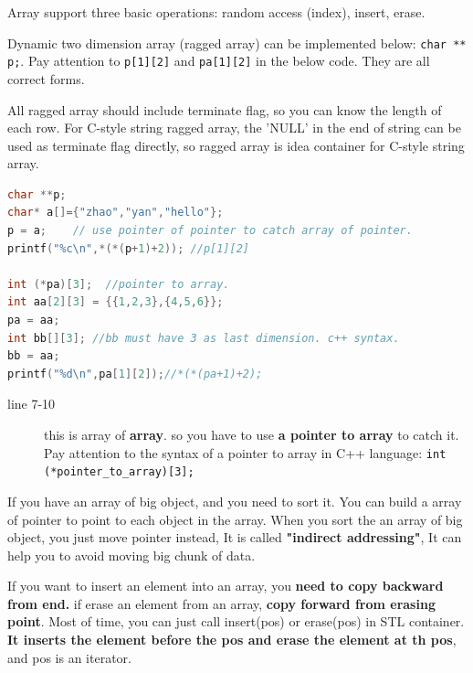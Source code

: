 \documentclass[a4paper,11pt,twoside]{book}
\begin{document}
	\par Array support three basic operations: random access (index), insert, erase.  

	\par Dynamic two dimension array (ragged array) can be implemented below:  \texttt{char ** p;}. Pay attention to \texttt{p[1][2]} and \texttt{pa[1][2]} in the below code. They are all correct forms.

	\par All ragged array should include terminate flag, so you can know the length of each row.  For C-style string ragged array, the 'NULL' in the end of string can be used as terminate flag directly, so ragged array is idea container for C-style string array. 

\begin{lstlisting}[frame=single, language=c++]
char **p;
char* a[]={"zhao","yan","hello"}; 
p = a;    // use pointer of pointer to catch array of pointer.
printf("%c\n",*(*(p+1)+2)); //p[1][2]

int (*pa)[3];  //pointer to array.
int aa[2][3] = {{1,2,3},{4,5,6}};
pa = aa;
int bb[][3]; //bb must have 3 as last dimension. c++ syntax.
bb = aa;
printf("%d\n",pa[1][2]);//*(*(pa+1)+2);
\end{lstlisting} 
\begin{description}
	\item[line 7-10] this is array of \textbf{array}. so you have to use \textbf{a pointer to array} to catch it. Pay attention to the syntax of a pointer to array in C++ language: \texttt{int (*pointer\_to\_array)[3];}
\end{description}




	\par If you have an array of big object, and you need to sort it. You can build a array of pointer to point to each object in the array. When you sort the an array of big object,  you just move pointer instead, It is called \textbf{"indirect addressing"}, It can help you to avoid moving big chunk of data.  


	\par If you want to insert an element into an array, you  \textbf{need to copy backward from end. }
if erase an element from an array, \textbf{copy forward from erasing point}. Most of time, you can just call insert(pos) or erase(pos) in STL container. \textbf{It inserts the element before the pos and erase the element at th pos}, and pos is an iterator.  
\end{document}
